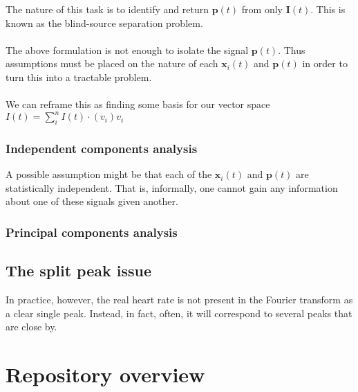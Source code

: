 The nature of this task is to identify and return $\mathbf{p}(t)$ from only $\mathbf{I}(t)$. This is known as the blind-source separation problem. 
\\ \\
The above formulation is not enough to isolate the signal $\mathbf{p}(t)$. Thus assumptions must be placed on the nature of each $\mathbf{x}_i(t)$ and $\mathbf{p}(t)$ in order to turn this into a tractable problem. 
\\ \\ 
We can reframe this as finding some basis for our vector space $I(t) = \sum_{i}^{n}I(t)\cdot(v_i)v_i$

\subsubsection{Independent components analysis}
A possible assumption might be that each of the $\mathbf{x}_i(t)$ and $\mathbf{p}(t)$ are statistically independent. That is, informally, one cannot gain any information about one of these signals given another.
%

\subsubsection{Principal components analysis}







\subsection{The split peak issue}
In practice, however, the real heart rate is not present in the Fourier transform as a clear single peak. Instead, in fact, often, it will correspond to several peaks that are close by.
\section{Repository overview}